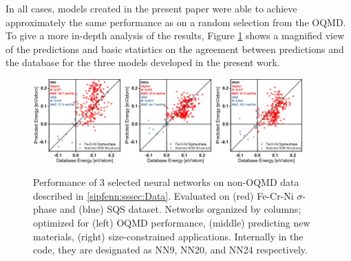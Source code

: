 In all cases, models created in the present paper were able to achieve approximately the same performance as on a random selection from the OQMD. To give a more in-depth analysis of the results, Figure \ref{sipfenn:fig:sigmasqsperformance} shows a magnified view of the predictions and basic statistics on the agreement between predictions and the database for the three models developed in the present work.

\begin{figure}[H]
\centering
    \includegraphics[width=0.3\textwidth]{sipfenn/NN9_sigmasqs.png}
    \hspace{0.03\textwidth}
    \includegraphics[width=0.3\textwidth]{sipfenn/NN24_sigmasqs.png}
    \hspace{0.03\textwidth}
    \includegraphics[width=0.3\textwidth]{sipfenn/NN20_sigmasqs.png}
    \caption{Performance of 3 selected neural networks on non-OQMD data described in \ref{sipfenn:sssec:Data}. Evaluated on (red) Fe-Cr-Ni $\sigma$-phase and (blue) SQS dataset. Networks organized by columns; optimized for (left) OQMD performance, (middle) predicting new materials, (right) size-constrained applications. Internally in the code, they are designated as NN9, NN20, and NN24 respectively.}
    \label{sipfenn:fig:sigmasqsperformance}
\end{figure}

